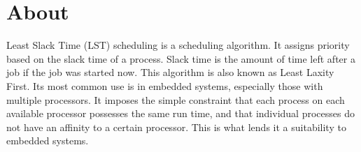 \section{About}

Least Slack Time (LST) scheduling is a scheduling algorithm. It assigns priority based on the slack time of a process. Slack time is the amount of time left after a job if the job was started now. This algorithm is also known as Least Laxity First. Its most common use is in embedded systems, especially those with multiple processors. It imposes the simple constraint that each process on each available processor possesses the same run time, and that individual processes do not have an affinity to a certain processor. This is what lends it a suitability to embedded systems.